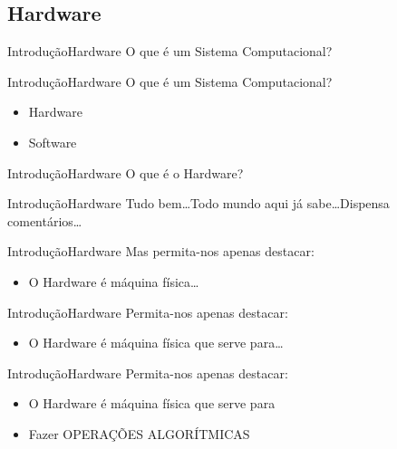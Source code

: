 \documentclass{beamer}
\begin{document}
    \subsection{Hardware}

      \begin{frame}{Introdução}{Hardware}
        O que é um Sistema Computacional?
      \end{frame}

      \begin{frame}{Introdução}{Hardware}
        O que é um Sistema Computacional?
        \begin{itemize}
          \item Hardware
          \item Software
        \end{itemize}
      \end{frame}


      \begin{frame}{Introdução}{Hardware}
        O que é o Hardware?
      \end{frame}

      \begin{frame}{Introdução}{Hardware}
        Tudo bem\dots Todo mundo aqui já sabe\dots Dispensa comentários\dots
      \end{frame}

      \begin{frame}{Introdução}{Hardware}
        Mas permita-nos apenas destacar:
        \begin{itemize}
          \item O Hardware é máquina física\dots
        \end{itemize}
      \end{frame}

      \begin{frame}{Introdução}{Hardware}
        Permita-nos apenas destacar:
        \begin{itemize}
          \item O Hardware é máquina física que serve para\dots   
        \end{itemize}
      \end{frame}

      \begin{frame}{Introdução}{Hardware}
        Permita-nos apenas destacar:
        \begin{itemize}
          \item O Hardware é máquina física que serve para 
          \item Fazer OPERAÇÕES ALGORÍTMICAS
        \end{itemize}
      \end{frame}
\end{document}
